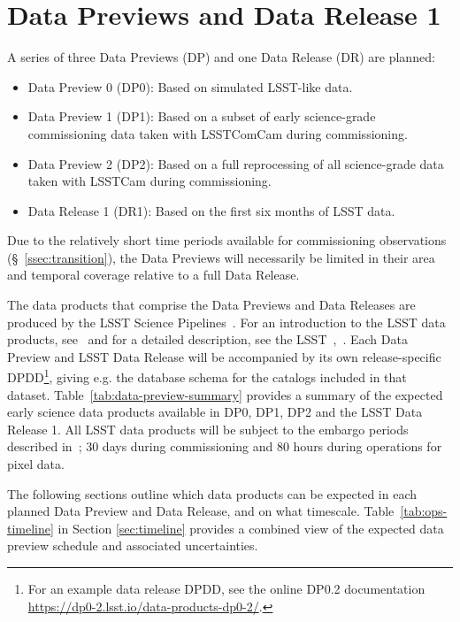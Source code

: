 \section{Data Previews and Data Release 1}
\label{sec:datapreview}

A series of three Data Previews (DP) and one Data Release (DR) are planned:
\begin{itemize}
\item Data Preview 0 (DP0): Based on simulated LSST-like data.
\item Data Preview 1 (DP1): Based on a subset of early science-grade commissioning data taken with LSSTComCam during commissioning.
\item Data Preview 2 (DP2): Based on a full reprocessing of all science-grade data taken with LSSTCam during commissioning.
\item Data Release 1 (DR1): Based on the first six months of LSST data.
\end{itemize}
Due to the relatively short time periods available for commissioning observations (\S~\ref{ssec:transition}), the Data Previews will necessarily be limited in their area and temporal coverage relative to a full Data Release.

The data products that comprise the Data Previews and Data Releases are produced by the LSST Science Pipelines~\citep{2019ASPC..523..521B,2018PASJ...70S...5B,PSTN-019}.
For an introduction to the LSST data products, see~\citet{RubinDataProductsAbridged} and for a detailed description, see the LSST~\dpdd{},~.
Each Data Preview and LSST Data Release will be accompanied by its own release-specific DPDD\footnote{For an example data release DPDD, see the online DP0.2 documentation {\url{https://dp0-2.lsst.io/data-products-dp0-2/}}.}, giving e.g. the  database schema for the catalogs included in that dataset.
Table~\ref{tab:data-preview-summary} provides a summary of the expected early science data products available in DP0, DP1, DP2 and the LSST Data Release 1.
All LSST data products will be subject to the embargo periods described in~; 30 days during commissioning and 80 hours during operations for pixel data.


The following sections outline which data products can be expected in each planned Data Preview and Data Release, and on what timescale.
Table~\ref{tab:ops-timeline} in Section  \ref{sec:timeline} provides a combined view of the expected data preview schedule and associated uncertainties.

